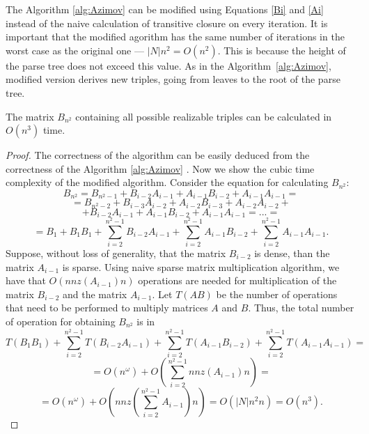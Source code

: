 The Algorithm \ref{alg:Azimov} can be modified using Equations \ref{Bi} and \ref{Ai} instead of the naive calculation of transitive closure on every iteration. It is important that the modified agorithm has the same number of iterations in the worst case as the original one --- $|N|n^2 = O(n^2)$. This is because the height of the parse tree does not exceed this value. As in the Algorithm~\ref{alg:Azimov}, modified version derives new triples, going from leaves to the root of the parse tree.
\begin{theorem}
The matrix $B_{n^2}$ containing all possible realizable triples can be calculated in $O(n^3)$ time.
\end{theorem}
\begin{proof}
The correctness of the algorithm can be easily deduced from the correctness of the Algorithm \ref{alg:Azimov} \cite{Azimov}. Now we show the cubic time complexity of the modified algorithm. Consider the equation for calculating $B_{n^2}$:
$$B_{n^2} = B_{n^2-1} + B_{i-2}A_{i-1} + A_{i-1}B_{i-2} + A_{i-1}A_{i-1} = $$
$$ = B_{n^2-2} + B_{i-3}A_{i-2} + A_{i-2}B_{i-3} + A_{i-2}A_{i-2} +$$ 
$$+ B_{i-2}A_{i-1} + A_{i-1}B_{i-2} + A_{i-1}A_{i-1} = ... =$$
$$= B_1 + B_1B_1 + \sum\limits_{i=2}^{n^2-1}B_{i-2}A_{i-1}+ \sum\limits_{i=2}^{n^2-1}A_{i-1}B_{i-2} + \sum\limits_{i=2}^{n^2-1}A_{i-1}A_{i-1}.$$
Suppose, without loss of generality, that the matrix $B_{i-2}$ is dense, than the matrix $A_{i-1}$ is sparse. Using naive sparse matrix multiplication algorithm, we have that $O(nnz(A_{i-1})n)$ operations are needed for multiplication of the matrix $B_{i-2}$ and the matrix $A_{i-1}$. Let $T(AB)$ be the number of operations that need to be performed to multiply matrices $A$ and $B$. Thus, the total number of operation for obtaining $B_{n^2}$ is in
$$ T(B_1B_1) + \sum\limits_{i=2}^{n^2-1}T(B_{i-2}A_{i-1})+ \sum\limits_{i=2}^{n^2-1}T(A_{i-1}B_{i-2}) + \sum\limits_{i=2}^{n^2-1}T(A_{i-1}A_{i-1})=$$
$$= O(n^{\omega}) +  O(\sum\limits_{i=2}^{n^2-1}nnz(A_{i-1})n) =$$
$$= O(n^{\omega}) + O(nnz(\sum\limits_{i=2}^{n^2-1}A_{i-1})n)  = O(|N|n^2n) = O(n^3).$$
\end{proof}